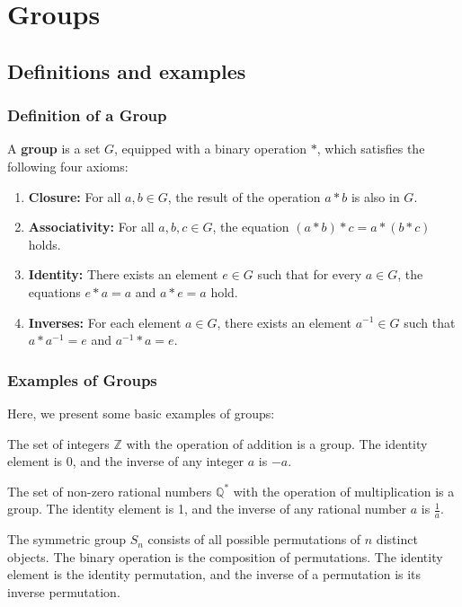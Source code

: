 \chapter{Groups}
\section{Definitions and examples}

\subsection{Definition of a Group}
A \textbf{group} is a set $G$, equipped with a binary operation $*$, which satisfies the following four axioms:

\begin{enumerate}
  \item \textbf{Closure:} For all $a, b \in G$, the result of the operation $a * b$ is also in $G$.
  \item \textbf{Associativity:} For all $a, b, c \in G$, the equation $(a * b) * c = a * (b * c)$ holds.
  \item \textbf{Identity:} There exists an element $e \in G$ such that for every $a \in G$, the equations $e * a = a$ and $a * e = a$ hold.
  \item \textbf{Inverses:} For each element $a \in G$, there exists an element $a^{-1} \in G$ such that $a * a^{-1} = e$ and $a^{-1} * a = e$.
\end{enumerate}

\subsection{Examples of Groups}
Here, we present some basic examples of groups:

\begin{example}
  The set of integers $\mathbb{Z}$ with the operation of addition is a group. The identity element is 0, and the inverse of any integer $a$ is $-a$.
\end{example}

\begin{example}
  The set of non-zero rational numbers $\mathbb{Q}^*$ with the operation of multiplication is a group. The identity element is 1, and the inverse of any rational number $a$ is $\frac{1}{a}$.
\end{example}

\begin{example}
  The symmetric group $S_n$ consists of all possible permutations of $n$ distinct objects. The binary operation is the composition of permutations. The identity element is the identity permutation, and the inverse of a permutation is its inverse permutation.
\end{example}

